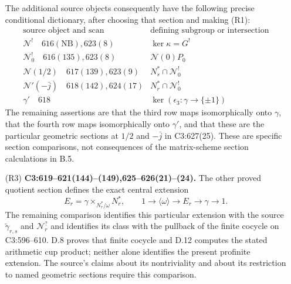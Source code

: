 \begin{enumerate}
The additional source objects consequently have the following
precise conditional dictionary, after choosing that section
and making (R1):
\[
\begin{array}{c|l}
\text{source object and scan}&\text{defining subgroup or intersection}\\ \hline
\mathscr N^!\quad616(\mathrm{NB}),623(8)&\ker\kappa=G^!\\
\mathscr N_0^!\quad616(135),623(8)&\mathscr N(0)P_0\\
\mathscr N(1/2)\quad617(139),623(9)&N_s^*\cap\mathscr N_0^!\\
\mathscr N'(-\bar j)\quad618(142),624(17)&N_r^*\cap\mathscr N_0^!\\
\gamma'\quad618&\ker(\epsilon_3:\gamma\to\{\pm1\})
\end{array}
 \tag{B.16.R2b}
\]
The remaining assertions are that the third row maps
isomorphically onto $\gamma$, that the fourth row maps
isomorphically onto $\gamma'$, and that these are the particular
geometric sections at $1/2$ and $-\bar j$ in C3:627(25).
These are specific section comparisons, not consequences of
the matrix-scheme section calculations in B.5.

\item[(R3)] \textbf{C3:619--621(144)--(149),625--626(21)--(24).}
The other proved quotient section defines the exact central
extension
\[
 E_r=\gamma\times_{N_r^*/\omega}N_r^*,
 \qquad1\to\langle\omega\rangle\to E_r\to\gamma\to1.
 \tag{B.16.R3}
\]
The remaining comparison identifies this particular extension
with the source $\widetilde\gamma_{r,s}$ and
$\mathcal N_r^?$ and identifies its class with the pullback
of the finite cocycle on C3:596--610. D.8 proves that finite
cocycle and D.12 computes the stated arithmetic cup product;
neither alone identifies the present profinite extension.
The source's claims about its nontriviality and about its
restriction to named geometric sections require this comparison.


\end{enumerate}
